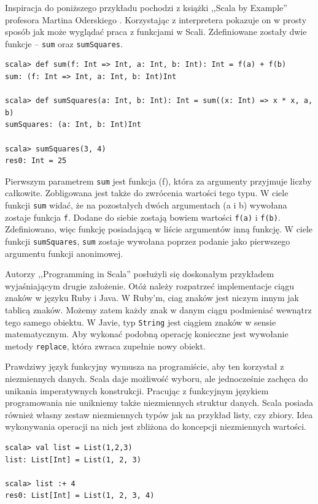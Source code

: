 \documentclass[brudnopis]{xmgr}
\begin{document}
Inspiracja do poniższego przykładu pochodzi z książki ,,Scala by Example'' profesora Martina Oderskiego \cite[s. 22]{Odersky:2014:SBE}. Korzystając z interpretera pokazuje on w prosty sposób jak może wyglądać praca z funkcjami w Scali. Zdefiniowane zostały dwie funkcje -- \texttt{sum} oraz \texttt{sumSquares}.

\begin{verbatim}
scala> def sum(f: Int => Int, a: Int, b: Int): Int = f(a) + f(b)
sum: (f: Int => Int, a: Int, b: Int)Int

scala> def sumSquares(a: Int, b: Int): Int = sum((x: Int) => x * x, a, b)
sumSquares: (a: Int, b: Int)Int

scala> sumSquares(3, 4)
res0: Int = 25
\end{verbatim}

Pierwszym parametrem \texttt{sum} jest funkcja (f), która za argumenty przyjmuje liczby całkowite. Zobligowana jest także do zwrócenia wartości tego typu. W ciele funkcji \texttt{sum} widać, że na pozostałych dwóch argumentach (a i b) wywołana zostaje funkcja \texttt{f}. Dodane do siebie zostają bowiem wartości \texttt{f(a)} i \texttt{f(b)}. Zdefiniowano, więc funkcję posiadającą w liście argumentów inną funkcję. W ciele funkcji \texttt{sumSquares}, \texttt{sum} zostaje wywołana poprzez podanie jako pierwszego argumentu funkcji anonimowej.

Autorzy ,,Programming in Scala'' posłużyli się doskonałym przykładem wyjaśniającym drugie założenie. \cite[s.57]{Odersky:2010:PIS} Otóż należy rozpatrzeć implementacje ciągu znaków w języku Ruby i Java. W Ruby'm, ciag znaków jest niczym innym jak tablicą znaków. Możemy zatem każdy znak w danym ciągu podmieniać wewnątrz tego samego obiektu. W Javie, typ \texttt{String} jest ciągiem znaków w sensie matematycznym. Aby wykonać podobną operację konieczne jest wywołanie metody \texttt{replace}, która zwraca zupełnie nowy obiekt.

Prawdziwy język funkcyjny wymusza na programiście, aby ten korzystał z niezmiennych danych. Scala daje możliwość wyboru, ale jednocześnie zachęca do unikania imperatywnych konstrukcji. Pracując z funkcyjnym językiem programowania nie unikniemy także niezmiennych struktur danych. Scala posiada również własny zestaw niezmiennych typów jak na przykład listy, czy zbiory. Idea wykonywania operacji na nich jest zbliżona do koncepcji niezmiennych wartości.

\begin{verbatim}
scala> val list = List(1,2,3)
list: List[Int] = List(1, 2, 3)

scala> list :+ 4
res0: List[Int] = List(1, 2, 3, 4)
\end{verbatim}
\end{document}
